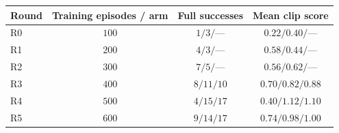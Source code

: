 \begin{tabular}{lccc}
\hline
Round & Training episodes / arm & Full successes & Mean clip score \\
\hline
R0 & $100$ & $1/3/\text{---}$ & $0.22/0.40/\text{---}$ \\
R1 & $200$ & $4/3/\text{---}$ & $0.58/0.44/\text{---}$ \\
R2 & $300$ & $7/5/\text{---}$ & $0.56/0.62/\text{---}$ \\
R3 & $400$ & $8/11/10$ & $0.70/0.82/0.88$ \\
R4 & $500$ & $4/15/17$ & $0.40/1.12/1.10$ \\
R5 & $600$ & $9/14/17$ & $0.74/0.98/1.00$ \\
\hline
\end{tabular}
